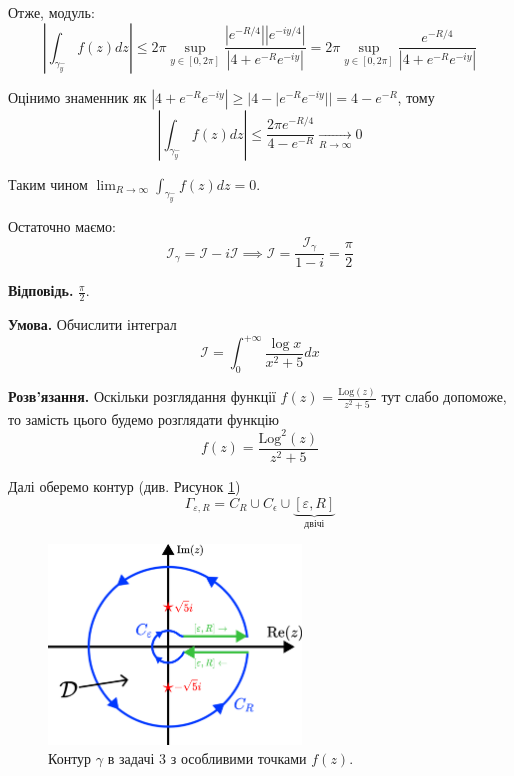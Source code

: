 \documentclass[oneside,solution]{karazin-complan-assign}
\begin{document}
Отже, модуль:
\begin{equation}
    \left|\int_{\gamma_y^-}f(z)dz\right| \leq 2\pi \sup_{y \in [0,2\pi]} \frac{|e^{-R/4}||e^{-iy/4}|}{|4+e^{-R}e^{-iy}|} = 2\pi \sup_{y \in [0,2\pi]} \frac{e^{-R/4}}{|4+e^{-R}e^{-iy}|}
\end{equation}

Оцінимо знаменник як $|4+e^{-R}e^{-iy}| \geq |4 - |e^{-R}e^{-iy}|| = 4 - e^{-R}$, тому
\begin{equation}
    \left|\int_{\gamma_y^-}f(z)dz\right| \leq \frac{2\pi e^{-R/4}}{4-e^{-R}} \xrightarrow[R \to \infty]{} 0
\end{equation}

Таким чином $\lim_{R \to \infty}\int_{\gamma_y^-}f(z)dz = 0$.

Остаточно маємо:
\begin{equation}
    \mathcal{I}_{\gamma} = \mathcal{I} - i\mathcal{I} \implies \mathcal{I} = \frac{\mathcal{I}_{\gamma}}{1-i} = \boxed{\frac{\pi}{2}}
\end{equation}

\textbf{Відповідь.} $\frac{\pi}{2}$. 

\problem{}

\textbf{Умова.} Обчислити інтеграл
\begin{equation*}
    \mathcal{I} = \int_{0}^{+\infty} \frac{\log x }{x^2+5}dx
\end{equation*}

\textbf{Розв'язання.} Оскільки розглядання функції $f(z) = \frac{\text{Log}(z)}{z^2+5}$ тут слабо допоможе, то замість цього будемо розглядати функцію 
\begin{equation}
    f(z) = \frac{\text{Log}^2(z)}{z^2+5}
\end{equation}

Далі оберемо контур (див. Рисунок \ref{fig:contour_3})
\begin{equation}
    \Gamma_{\varepsilon, R} = C_R \cup C_{\epsilon} \cup \underbrace{[\varepsilon, R]}_{\text{двічі}}
\end{equation}

\begin{figure}
    \centering
    \includegraphics[width=0.6\textwidth]{images/hw_3/contour_3.pdf}
    \caption{Контур $\gamma$ в задачі 3 з особливими точками $f(z)$.}
    \label{fig:contour_3}
\end{figure}
\end{document}
